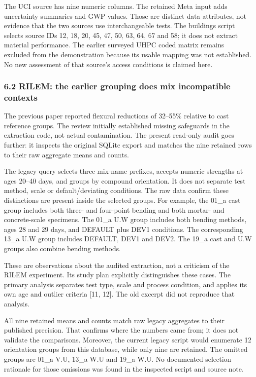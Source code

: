 \documentclass[
  american,
  11pt,
  letterpaper,
]{article}
\begin{document}
The UCI source has nine numeric columns. The retained Meta input adds
uncertainty summaries and GWP values. Those are distinct data
attributes, not evidence that the two sources use interchangeable tests.
The buildings script selects source IDs 12, 18, 20, 45, 47, 50, 63, 64,
67 and 58; it does not extract material performance. The earlier
surveyed UHPC coded matrix remains excluded from the demonstration
because its usable mapping was not established. No new assessment of
that source's access conditions is claimed here.

\subsubsection{6.2 RILEM: the earlier grouping does mix incompatible
contexts}\label{rilem-the-earlier-grouping-does-mix-incompatible-contexts}

The previous paper reported flexural reductions of 32--55\% relative to
cast reference groups. The review initially established missing
safeguards in the extraction code, not actual contamination. The present
read-only audit goes further: it inspects the original SQLite export and
matches the nine retained rows to their raw aggregate means and counts.

The legacy query selects three mix-name prefixes, accepts numeric
strengths at ages 20--40 days, and groups by compound orientation. It
does not separate test method, scale or default/deviating conditions.
The raw data confirm these distinctions are present inside the selected
groups. For example, the 01\_a cast group includes both three- and
four-point bending and both mortar- and concrete-scale specimens. The
01\_a U.W group includes both bending methods, ages 28 and 29 days, and
DEFAULT plus DEV1 conditions. The corresponding 13\_a U.W group includes
DEFAULT, DEV1 and DEV2. The 19\_a cast and U.W groups also combine
bending methods.

These are observations about the audited extraction, not a criticism of
the RILEM experiment. Its study plan explicitly distinguishes these
cases. The primary analysis separates test type, scale and process
condition, and applies its own age and outlier criteria {[}11, 12{]}.
The old excerpt did not reproduce that analysis.

All nine retained means and counts match raw legacy aggregates to their
published precision. That confirms where the numbers came from; it does
not validate the comparisons. Moreover, the current legacy script would
enumerate 12 orientation groups from this database, while only nine are
retained. The omitted groups are 01\_a V.U, 13\_a W.U and 19\_a W.U. No
documented selection rationale for those omissions was found in the
inspected script and source note.
\end{document}
